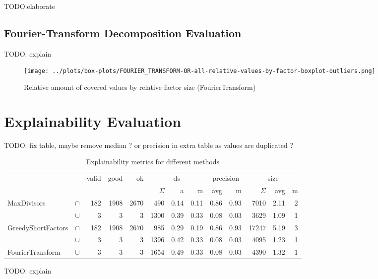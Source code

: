 TODO:elaborate

\newpage
\subsection{Fourier-Transform Decomposition Evaluation}
TODO: explain
\begin{figure}[h]
	\texttt{[image: ../plots/box-plots/FOURIER\_TRANSFORM-OR-all-relative-values-by-factor-boxplot-outliers.png]}
	\caption{Relative amount of covered values by relative factor size (FourierTransform)}
	\label{fig:eval:fourier-all-factors-box-plot}
\end{figure}

\newpage
\newpage
\section{Explainability Evaluation}
TODO: fix table, maybe remove median ? or precision in extra table as values are duplicated ?
\begin{table}[h]
	\begin{tabular}{ll||rrrrrr|rr|rrr}
		& & valid & good & ok &  \multicolumn{3}{c}{ds} & \multicolumn{2}{c}{precision} & \multicolumn{3}{c}{size}  \\
		& & & & & $\Sigma$ & a & m & avg & m & $\Sigma$ & avg & m\\
		\hline
		\hline
		\multirow{2}{*}{MaxDivisors} & $\cap$ & 182 & 1908 & 2670 & 490 & 0.14 & 0.11 &  0.86 & 0.93 & 7010 & 2.11 & 2 \\
		 & $\cup$ & 3 & 3 & 3 & 1300 & 0.39 & 0.33 & 0.08 & 0.03 & 3629 & 1.09 & 1 \\
		 \hline
		\multirow{2}{*}{GreedyShortFactors} & $\cap$ & 182 & 1908 & 2670 & 985 & 0.29 & 0.19 & 0.86 & 0.93 & 17247 & 5.19 & 3 \\
		& $\cup$ & 3 & 3 & 3 & 1396 & 0.42 & 0.33 & 0.08 & 0.03 & 4095 & 1.23 & 1 \\
		\hline
		FourierTransform & $\cup$ & 3 & 3 & 3 & 1654 & 0.49 & 0.33 & 0.08 & 0.03 & 4390 & 1.32 & 1 \\
	\end{tabular}
	\caption{Explainability metrics for different methods}
	\label{tab:eval-metric}
\end{table}

TODO: explain
